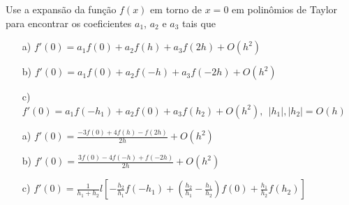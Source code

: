 \begin{Exercise} Use a expansão da função $f(x)$ em torno de $x=0$ em polinômios de Taylor para encontrar os coeficientes $a_1$, $a_2$ e $a_3$ tais que
\begin{itemize}
\item[a)] $f'(0)=a_1f(0)+a_2f(h)+a_3f(2h) + O(h^2)$
\item[b)] $f'(0)=a_1f(0)+a_2f(-h)+a_3f(-2h) + O(h^2)$
\item[c)] $f'(0)=a_1f(-h_1)+a_2f(0)+a_3f(h_2) + O(h^2),~~|h_1|, |h_2|=O(h)$
\end{itemize}
\end{Exercise}
\begin{Answer}
  \begin{tiny}
\begin{itemize}
\item[a)] $f'(0)=\frac{-3f(0)+4f(h)-f(2h)}{2h} + O(h^2)$
\item[b)] $f'(0)=\frac{3f(0)-4f(-h)+f(-2h)}{2h} + O(h^2)$
\item[c)] $f'(0)=\frac{1}{h_1+h_2}l\left[-\frac{h_2}{h_1}f(-h_1) +\left(\frac{h_2}{h_1}-\frac{h_1}{h_2}\right)f(0)+ \frac{h_1}{h_2}f(h_2)\right]$
\end{itemize}    
  \end{tiny}
\end{Answer}

